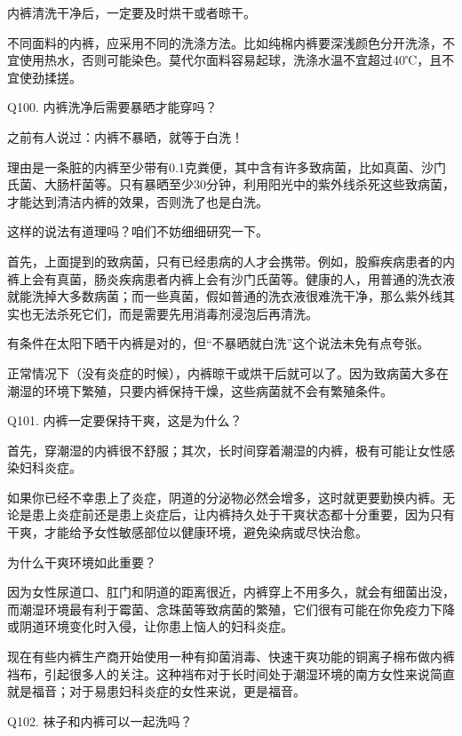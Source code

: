 \documentclass[12pt,UTF8]{ctexbook}
\begin{document}
内裤清洗干净后，一定要及时烘干或者晾干。

不同面料的内裤，应采用不同的洗涤方法。比如纯棉内裤要深浅颜色分开洗涤，不宜使用热水，否则可能染色。莫代尔面料容易起球，洗涤水温不宜超过40℃，且不宜使劲揉搓。





Q100. 内裤洗净后需要暴晒才能穿吗？


之前有人说过：内裤不暴晒，就等于白洗！

理由是一条脏的内裤至少带有0.1克粪便，其中含有许多致病菌，比如真菌、沙门氏菌、大肠杆菌等。只有暴晒至少30分钟，利用阳光中的紫外线杀死这些致病菌，才能达到清洁内裤的效果，否则洗了也是白洗。

这样的说法有道理吗？咱们不妨细细研究一下。

首先，上面提到的致病菌，只有已经患病的人才会携带。例如，股癣疾病患者的内裤上会有真菌，肠炎疾病患者内裤上会有沙门氏菌等。健康的人，用普通的洗衣液就能洗掉大多数病菌；而一些真菌，假如普通的洗衣液很难洗干净，那么紫外线其实也无法杀死它们，而是需要先用消毒剂浸泡后再清洗。

有条件在太阳下晒干内裤是对的，但“不暴晒就白洗”这个说法未免有点夸张。

正常情况下（没有炎症的时候），内裤晾干或烘干后就可以了。因为致病菌大多在潮湿的环境下繁殖，只要内裤保持干燥，这些病菌就不会有繁殖条件。





Q101. 内裤一定要保持干爽，这是为什么？


首先，穿潮湿的内裤很不舒服；其次，长时间穿着潮湿的内裤，极有可能让女性感染妇科炎症。


如果你已经不幸患上了炎症，阴道的分泌物必然会增多，这时就更要勤换内裤。无论是患上炎症前还是患上炎症后，让内裤持久处于干爽状态都十分重要，因为只有干爽，才能给予女性敏感部位以健康环境，避免染病或尽快治愈。


为什么干爽环境如此重要？

因为女性尿道口、肛门和阴道的距离很近，内裤穿上不用多久，就会有细菌出没，而潮湿环境最有利于霉菌、念珠菌等致病菌的繁殖，它们很有可能在你免疫力下降或阴道环境变化时入侵，让你患上恼人的妇科炎症。

现在有些内裤生产商开始使用一种有抑菌消毒、快速干爽功能的铜离子棉布做内裤裆布，引起很多人的关注。这种裆布对于长时间处于潮湿环境的南方女性来说简直就是福音；对于易患妇科炎症的女性来说，更是福音。





Q102. 袜子和内裤可以一起洗吗？
\end{document}

